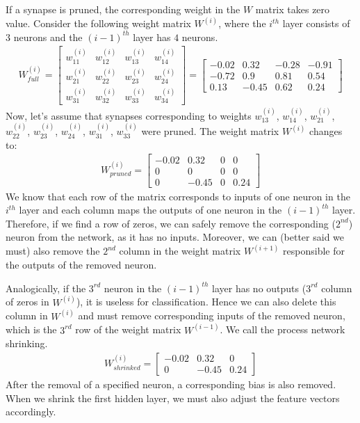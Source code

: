 If a synapse is pruned, the corresponding weight in the $ W $ matrix takes zero value. Consider the following weight matrix $ W^{(i)} $, where the $ i^{th} $ layer consists of $ 3 $ neurons and the $ (i-1)^{th} $ layer has $ 4 $ neurons.
\begin{align*}
W_{full}^{(i)} = 
\begin{bmatrix}
    w_{11}^{(i)} & w_{12}^{(i)} & w_{13}^{(i)} & w_{14}^{(i)} \\
    w_{21}^{(i)} & w_{22}^{(i)} & w_{23}^{(i)} & w_{24}^{(i)} \\
    w_{31}^{(i)} & w_{32}^{(i)} & w_{33}^{(i)} & w_{34}^{(i)}
\end{bmatrix}
=
\begin{bmatrix}
    -0.02 & 0.32 & -0.28 & -0.91 \\
    -0.72 & 0.9 & 0.81 & 0.54 \\
    0.13 & -0.45 & 0.62 & 0.24
\end{bmatrix}
\end{align*}
Now, let's assume that synapses corresponding to weights $ w_{13}^{(i)} $, $ w_{14}^{(i)} $, $ w_{21}^{(i)} $, $ w_{22}^{(i)} $, $ w_{23}^{(i)} $, $ w_{24}^{(i)} $, $ w_{31}^{(i)} $, $ w_{33}^{(i)} $ were pruned. The weight matrix $ W^{(i)} $ changes to:
\begin{align*}
W_{pruned}^{(i)} = 
\begin{bmatrix}
    -0.02 & 0.32 & 0 & 0 \\
    0 & 0 & 0 & 0 \\
    0 & -0.45 & 0 & 0.24
\end{bmatrix}
\end{align*}
We know that each row of the matrix corresponds to inputs of one neuron in the $ i^{th} $ layer and each column maps the outputs of one neuron in the $ (i-1)^{th} $ layer. Therefore, if we find a row of zeros, we can safely remove the corresponding ($ 2^{nd} $) neuron from the network, as it has no inputs. Moreover, we can (better said we must) also remove the $ 2^{nd} $ column in the weight matrix $ W^{(i+1)} $ responsible for the outputs of the removed neuron.

Analogically, if the $ 3^{rd} $ neuron in the $ (i-1)^{th} $ layer has no outputs ($ 3^{rd} $ column of zeros in $ W^{(i)} $), it is useless for classification. Hence we can also delete this column in $ W^{(i)} $ and must remove corresponding inputs of the removed neuron, which is the $ 3^{rd} $ row of the weight matrix $ W^{(i-1)} $. We call the process network shrinking.
\begin{align*}
W_{shrinked}^{(i)} = 
\begin{bmatrix}
    -0.02 & 0.32 & 0 \\
    0 & -0.45 & 0.24
\end{bmatrix}
\end{align*}
After the removal of a specified neuron, a corresponding bias is also removed. When we shrink the first hidden layer, we must also adjust the feature vectors accordingly.

